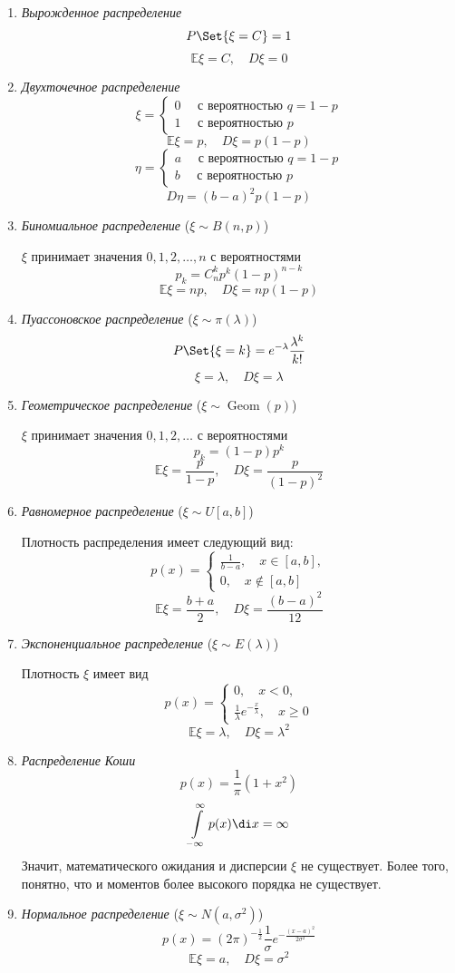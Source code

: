 \begin{enumerate}
	\item \emph{Вырожденное распределение}
		$$ P\Set{\xi = C} = 1 $$
		$$ \mathbb E \xi = C, \quad D\xi = 0 $$
	\item \emph{Двухточечное распределение}
		$$ \xi =
		\begin{cases}
			0 \quad \text{ с вероятностью } q = 1 - p \\
			1 \quad \text{ с вероятностью } p
		\end{cases} $$
		$$ \mathbb E \xi = p, \quad D \xi = p(1 - p) $$
		$$ \eta =
		\begin{cases}
			a \quad \text{ с вероятностью } q = 1 - p \\
			b \quad \text{ с вероятностью } p
		\end{cases} $$
		$$ D \eta = (b - a)^2p(1 - p) $$
	\item \emph{Биномиальное распределение} ($ \xi \sim B(n, p) $)

		$ \xi $ принимает значения $ 0, 1, 2, \dots, n $ с вероятностями
		$$ p_k = C_n^kp^k(1 - p)^{n - k} $$
		$$ \mathbb E \xi = np, \quad D \xi = np(1 - p) $$
	\item \emph{Пуассоновское распределение} ($ \xi \sim \pi(\lambda) $)
		$$ P\Set{\xi = k} = e^{-\lambda}\frac{\lambda^k}{k!} $$
		$$ \mathbb \xi = \lambda, \quad D\xi = \lambda $$
	\item \emph{Геометрическое распределение} ($ \xi \sim \operatorname{Geom}(p) $)

		$ \xi $ принимает значения $ 0, 1, 2, \dotsc $ с вероятностями
		$$ p_k = (1 - p)p^k $$
		$$ \mathbb E\xi = \frac p{1 - p}, \quad D \xi = \frac p{(1 - p)^2} $$
	\item \emph{Равномерное распределение} ($ \xi \sim U[a, b] $)

		Плотность распределения имеет следующий вид:
		$$ p(x) =
		\begin{cases}
			\frac1{b - a}, \quad x \in [a, b], \\
			0, \quad x \not\in [a, b]
		\end{cases} $$
		$$ \mathbb E \xi = \frac{b + a}2, \quad D \xi = \frac{(b - a)^2}{12} $$
	\item \emph{Экспоненциальное распределение} ($ \xi \sim E(\lambda) $)

		Плотность $ \xi $ имеет вид
		$$ p(x) =
		\begin{cases}
			0, \quad x < 0, \\
			\frac1\lambda e^{-\frac x \lambda}, \quad x \ge 0
		\end{cases} $$
		$$ \mathbb E \xi = \lambda, \quad D\xi = \lambda^2 $$
	\item \emph{Распределение Коши}
		$$ p(x) = \frac1\pi (1 + x^2) $$
		$$ \int\limits_{-\infty}^\infty p(x) \di x = \infty $$
		Значит, математического ожидания и дисперсии $ \xi $ не существует.
		Более того, понятно, что и моментов более высокого порядка не существует.
	\item \emph{Нормальное распределение} ($ \xi \sim N(a, \sigma^2) $)
		$$ p(x) = (2\pi)^{-\frac12} \frac1\sigma e^{-\frac{(x - a)^2}{2\sigma^2}} $$
		$$ \mathbb E \xi = a, \quad D \xi = \sigma^2 $$
\end{enumerate}

